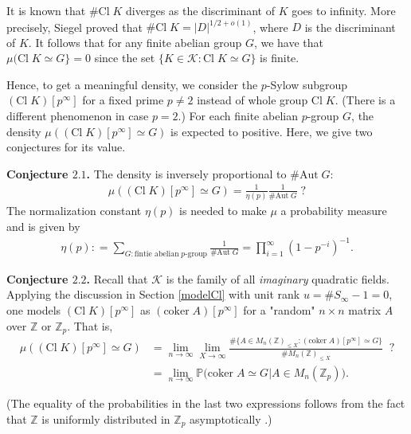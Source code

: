 \documentclass[12pt,reqno]{amsart}
\numberwithin{equation}{section}
\def\Z{{\mathbb Z}}
\def\P{{\mathbb P}}
\def\sK{{\mathscr K}}
\begin{document}
It is known that $\# \text{Cl} \; K$ diverges as the discriminant of $K$ goes to infinity. More precisely, Siegel proved that $\# \text{Cl} \; K = |D|^{1/2+o(1)}$, where $D$ is the discriminant of $K$. 
It follows that for any finite abelian group $G$, we have that $\mu(\text{Cl} \; K \simeq G \} = 0$ since the set $\{K \in \sK : \text{Cl} \; K \simeq G\}$ is finite.

Hence, to get a meaningful density, we consider the $p$-Sylow subgroup $(\text{Cl} \; K)[p^\infty]$ for a fixed prime $p \neq 2$ instead of whole group $\text{Cl} \; K$. (There is a different phenomenon in case $p = 2$.) For each finite abelian $p$-group $G$, the density $\mu((\text{Cl} \; K)[p^\infty] \simeq G)$ is expected to positive. Here, we give two conjectures for its value.

\smallskip
{\bf Conjecture $\mathbf{2.1}$.}
The density is inversely proportional to $\# \text{Aut} \; G$:
\begin{align*}
\mu((\text{Cl} \; K)[p^\infty] \simeq G) = \frac{1}{\eta(p)} \frac{1}{\# \text{Aut} \; G} \; ?
\end{align*}
The normalization constant $\eta(p)$ is needed to make $\mu$ a probability measure and is given by
\begin{align*}
\eta(p) : = \sum_{G: \text{fintie abelian} \; p \text{-group}} \frac{1}{\# \text{Aut} \; G} = \prod_{i=1}^\infty (1-p^{-i})^{-1}.
\end{align*}

\smallskip

{\bf Conjecture $\mathbf{2.2}$.}
Recall that $\sK$ is the family of all \textit{imaginary} quadratic fields.
Applying the discussion in Section \ref{modelCl} with unit rank $u = \# S_\infty -1 = 0$, one models $(\text{Cl} \; K)[p^\infty]$ as $(\text{coker} \; A)[p^\infty]$ for a "random" $n \times n$ matrix $A$ over $\Z$ or $\Z_p$. That is,
\begin{align*}
\mu((\text{Cl} \; K)[p^\infty] \simeq G) &= \lim_{n \to \infty} \lim_{X \to \infty} \frac{ \#\{A \in M_n(\Z)_{\le X} : (\text{coker} \; A)[p^\infty] \simeq G \}}{\# M_n(\Z)_{\le X}} \;\; ? \\
& = \lim_{n \to \infty} \P\big( \text{coker} \; A \simeq G | A \in M_n(\Z_p)\big).
\end{align*}

(The equality of the probabilities in the last two expressions follows from the fact that $\Z$ is uniformly distributed in $\Z_p$ asymptotically .)

\vspace{2mm}
\end{document}
